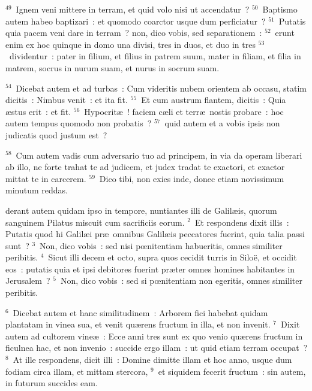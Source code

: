 ${}^{49}$~Ignem veni mittere in terram, et quid volo nisi ut accendatur~?
${}^{50}$~Baptismo autem habeo baptizari~: et quomodo coarctor usque dum perficiatur~?
${}^{51}$~Putatis quia pacem veni dare in terram~? non, dico vobis, sed separationem~:
${}^{52}$~erunt enim ex hoc quinque in domo una divisi, tres in duos, et duo in tres
${}^{53}$~dividentur~: pater in filium, et filius in patrem suum, mater in filiam, et filia in matrem, socrus in nurum suam, et nurus in socrum suam.


${}^{54}$~Dicebat autem et ad turbas~: Cum videritis nubem orientem ab occasu, statim dicitis~: Nimbus venit~: et ita fit.
${}^{55}$~Et cum austrum flantem, dicitis~: Quia \ae stus erit~: et fit.
${}^{56}$~Hypocrit\ae~! faciem c\ae li et terr\ae\ nostis probare~: hoc autem tempus quomodo non probatis~?
${}^{57}$~quid autem et a vobis ipsis non judicatis quod justum est~?


${}^{58}$~Cum autem vadis cum adversario tuo ad principem, in via da operam liberari ab illo, ne forte trahat te ad judicem, et judex tradat te exactori, et exactor mittat te in carcerem.
${}^{59}$~Dico tibi, non exies inde, donec etiam novissimum minutum reddas.

\bchapter
{}derant autem quidam ipso in tempore, nuntiantes illi de Galil\ae is, quorum sanguinem Pilatus miscuit cum sacrificiis eorum.
${}^{2}$~Et respondens dixit illis~: Putatis quod hi Galil\ae i pr\ae\ omnibus Galil\ae is peccatores fuerint, quia talia passi sunt~?
${}^{3}$~Non, dico vobis~: sed nisi pœnitentiam habueritis, omnes similiter peribitis.
${}^{4}$~Sicut illi decem et octo, supra quos cecidit turris in Silo\"e, et occidit eos~: putatis quia et ipsi debitores fuerint pr\ae ter omnes homines habitantes in Jerusalem~?
${}^{5}$~Non, dico vobis~: sed si pœnitentiam non egeritis, omnes similiter peribitis.


${}^{6}$~Dicebat autem et hanc similitudinem~: Arborem fici habebat quidam plantatam in vinea sua, et venit qu\ae rens fructum in illa, et non invenit.
${}^{7}$~Dixit autem ad cultorem vine\ae~: Ecce anni tres sunt ex quo venio qu\ae rens fructum in ficulnea hac, et non invenio~: succide ergo illam~: ut quid etiam terram occupat~?
${}^{8}$~At ille respondens, dicit illi~: Domine dimitte illam et hoc anno, usque dum fodiam circa illam, et mittam stercora,
${}^{9}$~et siquidem fecerit fructum~: sin autem, in futurum succides eam.


